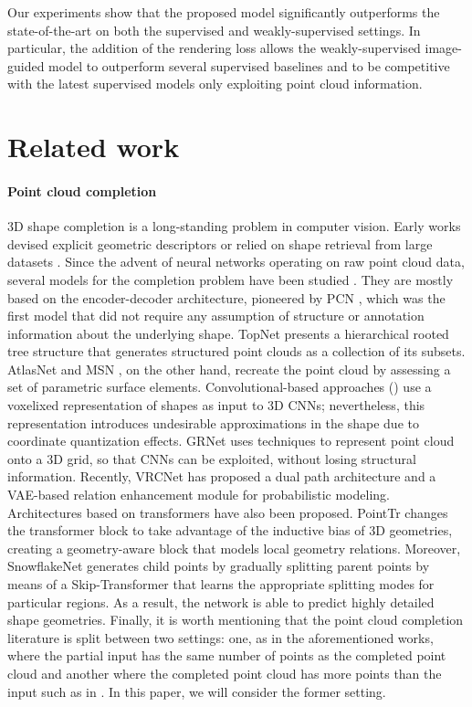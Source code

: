 \documentclass{article}
\begin{document}
Our experiments show that the proposed model significantly outperforms the state-of-the-art on both the supervised and weakly-supervised settings. In particular, the addition of the rendering loss allows the weakly-supervised image-guided model to outperform several supervised baselines and to be competitive with the latest supervised models only exploiting point cloud information.


\vspace{-5pt}
\section{Related work} 
\vspace{-5pt}

\paragraph{Point cloud completion} 3D shape completion is a long-standing problem in computer vision. Early works devised explicit geometric descriptors or relied on shape retrieval from large datasets \cite{data-driven} \cite{symmetry} \cite{geometry} \cite{primitive}. Since the advent of neural networks operating on raw point cloud data, several models for the completion problem have been studied \cite{review}. They are mostly based on the encoder-decoder architecture, pioneered by PCN \cite{pcn}, which was the first model that did not require any assumption of structure or annotation information about the underlying shape.  TopNet \cite{topnet} presents a hierarchical rooted tree structure that generates structured point clouds as a collection of its subsets. AtlasNet \cite{atlas} and MSN \cite{msn}, on the other hand, recreate the point cloud by assessing a set of parametric surface elements. Convolutional-based approaches (\cite{voxel1, voxel2}) use a voxelixed representation of shapes as input to 3D CNNs; nevertheless, this representation introduces undesirable approximations in the shape due to coordinate quantization effects. GRNet \cite{grnet} uses techniques to represent point cloud onto a 3D grid, so that CNNs can be exploited, without losing structural information. Recently, VRCNet \cite{vrc} has proposed a dual path architecture and a VAE-based relation enhancement module for probabilistic modeling. Architectures based on transformers have also been proposed. PointTr \cite{pointtr} changes the transformer block to take advantage of the inductive bias of 3D geometries, creating a geometry-aware block that models local geometry relations. Moreover, SnowflakeNet \cite{snowflake} generates child points by gradually splitting parent points by means of a Skip-Transformer that learns the appropriate splitting modes for particular regions. As a result, the network is able to predict highly detailed shape geometries. Finally, it is worth mentioning that the point cloud completion literature is split between two settings: one, as in the aforementioned works, where the partial input has the same number of points as the completed point cloud and another where the completed point cloud has more points than the input such as in \cite{huang2020pf,alliegro2021denoise}. In this paper, we will consider the former setting.
\end{document}
